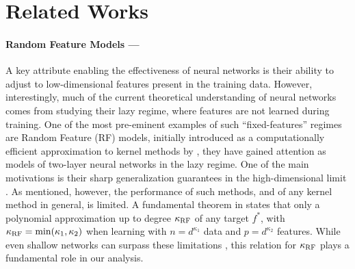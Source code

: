 \section{Related Works}
\vspace{-0.1cm}
\paragraph {Random Feature Models ---} A key attribute enabling the effectiveness of neural networks is their ability to adjust to low-dimensional features present in the training data. However, interestingly, much of the current theoretical understanding of neural networks comes from studying their lazy regime, where features are not learned during training. One of the most pre-eminent examples of such ``fixed-features'' regimes are Random Feature (RF) models, initially introduced as a computationally efficient approximation to kernel methods by \cite{rahimi2007random}, they have gained attention as models of two-layer neural networks in the lazy regime. One of the main motivations is their sharp generalization guarantees in the high-dimensional limit \citep{gerace2020generalisation,goldt_gaussian_2021,mei2022generalization, Mei2023,xiao2022precise,defilippis2024dimension}. As mentioned, however, the performance of such methods, and of any kernel method in general, is limited. A fundamental theorem in \cite{mei2022generalization} states that only a polynomial approximation up to degree $\kappa_{\rm RF}$ of any target $f^*$, with $\kappa_{\rm RF} = {\rm min} (\kappa_1,\kappa_2)$ when learning with $n=d^{\kappa_1}$ data and $p=d^{\kappa_2}$ features. While even shallow networks can surpass these limitations \citep{ghorbani2021linearized,ba2020generalization,dandi2024random}, this relation for $\kappa_{\rm RF}$ plays a fundamental role in our analysis. 

